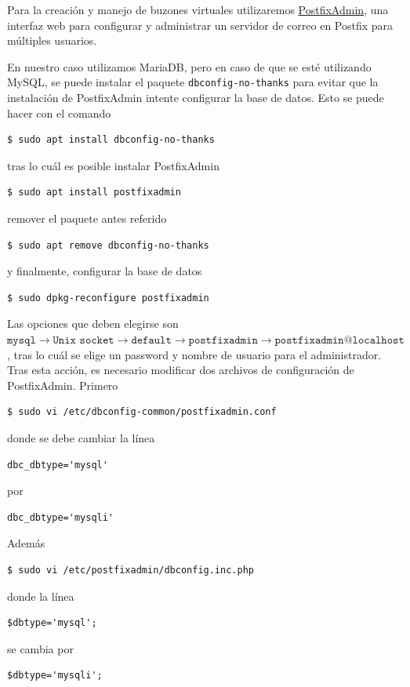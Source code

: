 \documentclass{article}
\newcommand{\ttt}[1]{%
\texttt{#1}%
}
\begin{document}
Para la creaci\'on y manejo de buzones virtuales
utilizaremos
\href{http://postfixadmin.sourceforge.net/}{PostfixAdmin},
una interfaz web para configurar y administrar un servidor
de correo en Postfix para m\'ultiples usuarios.

En nuestro caso utilizamos MariaDB, pero en caso de
que se est\'e utilizando MySQL, se puede instalar
el paquete \ttt{dbconfig-no-thanks} para evitar que
la instalaci\'on de PostfixAdmin intente configurar
la base de datos.   Esto se puede hacer con el comando
\begin{lstlisting}
$ sudo apt install dbconfig-no-thanks
\end{lstlisting}
tras lo cu\'al es posible instalar PostfixAdmin
\begin{lstlisting}
$ sudo apt install postfixadmin
\end{lstlisting}
remover el paquete antes referido
\begin{lstlisting}
$ sudo apt remove dbconfig-no-thanks
\end{lstlisting}
y finalmente, configurar la base de datos
\begin{lstlisting}
$ sudo dpkg-reconfigure postfixadmin
\end{lstlisting}

Las opciones que deben elegirse son
$\ttt{mysql} \to \ttt{Unix socket} \to
 \ttt{default} \to \ttt{postfixadmin} \to
 \ttt{postfixadmin@localhost}$, tras lo
cu\'al se elige un password y nombre de
usuario para el administrador.   Tras
esta acci\'on, es necesario modificar
dos archivos de configuraci\'on de
PostfixAdmin.   Primero
\begin{lstlisting}
$ sudo vi /etc/dbconfig-common/postfixadmin.conf
\end{lstlisting}
donde se debe cambiar la l\'inea
\begin{lstlisting}
dbc_dbtype='mysql'
\end{lstlisting}
por
\begin{lstlisting}
dbc_dbtype='mysqli'
\end{lstlisting}

Adem\'as
\begin{lstlisting}
$ sudo vi /etc/postfixadmin/dbconfig.inc.php
\end{lstlisting}
donde la l\'inea
\begin{lstlisting}
$dbtype='mysql';
\end{lstlisting}
se cambia por \begin{lstlisting}
$dbtype='mysqli';
\end{lstlisting}
\end{document}
